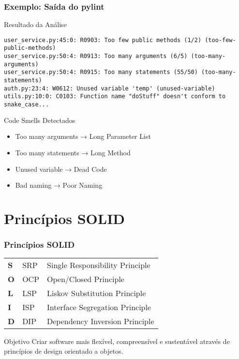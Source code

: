\documentclass[aspectratio=169]{beamer}
\begin{document}
\begin{frame}[fragile]
\frametitle{Exemplo: Saída do pylint}
\begin{block}{Resultado da Análise}
\scriptsize
\begin{verbatim}
user_service.py:45:0: R0903: Too few public methods (1/2) (too-few-public-methods)
user_service.py:50:4: R0913: Too many arguments (6/5) (too-many-arguments)
user_service.py:50:4: R0915: Too many statements (55/50) (too-many-statements)
auth.py:23:4: W0612: Unused variable 'temp' (unused-variable)
utils.py:10:0: C0103: Function name "doStuff" doesn't conform to snake_case...
\end{verbatim}
\end{block}

\begin{block}{Code Smells Detectados}
\footnotesize
\begin{itemize}
    \item \textcolor{cleanred}{Too many arguments} → Long Parameter List
    \item \textcolor{cleanred}{Too many statements} → Long Method
    \item \textcolor{cleanred}{Unused variable} → Dead Code
    \item \textcolor{cleanred}{Bad naming} → Poor Naming
\end{itemize}
\end{block}
\end{frame}

\section{Princípios SOLID}

\begin{frame}
\frametitle{Princípios SOLID}
\begin{center}
\begin{tabular}{lll}
\textbf{S} & SRP & Single Responsibility Principle \\
\textbf{O} & OCP & Open/Closed Principle \\
\textbf{L} & LSP & Liskov Substitution Principle \\
\textbf{I} & ISP & Interface Segregation Principle \\
\textbf{D} & DIP & Dependency Inversion Principle \\
\end{tabular}
\end{center}

\vspace{0.5cm}
\begin{block}{Objetivo}
\footnotesize
\vspace{0.05cm}
Criar software mais flexível, compreensível e sustentável através de princípios de design orientado a objetos.
\end{block}
\end{frame}
\end{document}
